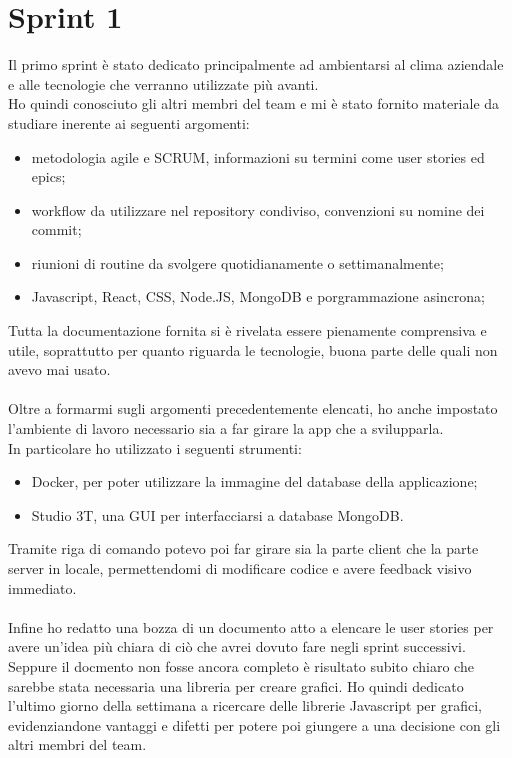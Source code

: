 
\chapter{Sprint 1}
\label{cap:sprint1}

Il primo sprint è stato dedicato principalmente ad ambientarsi al clima aziendale e alle tecnologie che verranno utilizzate più avanti. \\
Ho quindi conosciuto gli altri membri del team e mi è stato fornito materiale da studiare inerente ai seguenti argomenti:
\begin{itemize}
  \item metodologia agile e SCRUM, informazioni su termini come user stories ed epics;
  \item workflow da utilizzare nel repository condiviso, convenzioni su nomine dei commit;
  \item riunioni di routine da svolgere quotidianamente o settimanalmente;
  \item Javascript, React, CSS, Node.JS, MongoDB e porgrammazione asincrona; 
\end{itemize}

\noindent Tutta la documentazione fornita si è rivelata essere pienamente comprensiva e utile, soprattutto per quanto riguarda le tecnologie, buona parte delle quali non avevo mai usato. \\\\
Oltre a formarmi sugli argomenti precedentemente elencati, ho anche impostato l'ambiente di lavoro necessario sia a far girare la app che a svilupparla. \\
In particolare ho utilizzato i seguenti strumenti:
\begin{itemize}
  \item Docker, per poter utilizzare la immagine del database della applicazione;
  \item Studio 3T, una GUI per interfacciarsi a database MongoDB.
\end{itemize}

\noindent Tramite riga di comando potevo poi far girare sia la parte client che la parte server in locale, permettendomi di modificare codice e avere feedback visivo immediato. \\\\
\noindent Infine ho redatto una bozza di un documento atto a elencare le user stories per avere un'idea più chiara di ciò che avrei dovuto fare negli sprint successivi.\\
Seppure il docmento non fosse ancora completo è risultato subito chiaro che sarebbe stata necessaria una libreria per creare grafici. Ho quindi dedicato l'ultimo giorno della settimana a ricercare delle librerie Javascript per grafici, evidenziandone vantaggi e difetti per potere poi giungere a una decisione con gli altri membri del team.
